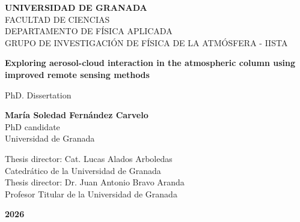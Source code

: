 \begin{center}
\begin{spacing}{1.3}
\textbf{\Large UNIVERSIDAD DE GRANADA}\\
{\large FACULTAD DE CIENCIAS}\\
{\large DEPARTAMENTO DE FÍSICA APLICADA}\\
{\large GRUPO DE INVESTIGACIÓN DE FÍSICA DE LA ATMÓSFERA - IISTA}\\
\end{spacing}
\end{center}

\vspace{23mm}

\begin{center}
\begin{spacing}{1.6}
\textbf{\LARGE Exploring aerosol-cloud interaction in the atmospheric column using improved remote sensing methods}
\end{spacing}
\end{center}

\vspace{10 mm}

\begin{center}
{\Large PhD. Dissertation}
\end{center}

\vspace{10 mm}

\begin{center}
\begin{spacing}{1.7}
\textbf{\Large María Soledad Fernández Carvelo}\\
{\large PhD candidate}\\
{\large Universidad de Granada}\\
\end{spacing}
\end{center}

\vspace{15 mm}

\begin{center}
\begin{spacing}{1.5}
    {\Large Thesis director: Cat. Lucas Alados Arboledas}\\
    {\large Catedrático de la Universidad de Granada}\\
    {\Large Thesis director: Dr. Juan Antonio Bravo Aranda}\\
    {\large Profesor Titular de la Universidad de Granada}\\
\end{spacing}
\end{center}

\vspace{10 mm}

\begin{center}
    \textbf{\Large 2026}
\end{center}